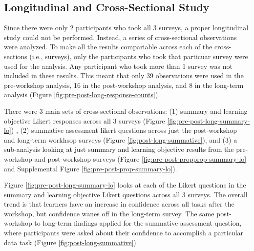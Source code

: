 \documentclass[030-workshop.tex]{subfiles}
\begin{document}
    \subsection{Longitudinal and Cross-Sectional Study}

        Since there were only 2 participants who took all 3 surveys,
        a proper longitudinal study could not be performed.
        Instead, a series of cross-sectional observations were analyzed.
        To make all the results compariable across each of the cross-sections (i.e., surveys),
        only the participants who took that particuar survey were used for the analysis.
        Any participant who took more than 1 survey was not included in these results.
        This meant that only
        39 observations were used in the pre-workshop analysis,
        16 in the post-workshop analysis, and
        8 in the long-term analysis
        (Figure \ref{fig:pre-post-long-response-counts}).

        There were 3 main sets of cross-sectional observations:
        (1) summary and learning objective Likert responses across all 3 surveys
        (Figure \ref{fig:pre-post-long-summary-lo})
        ,
        (2) summative assessment likert questions across just the post-workshop and long-term workhsop surveys
        (Figure \ref{fig:post-long-summative}), and
        (3) a sub-analysis looking at just summary and learning objective results from the pre-workshop and post-workshop surveys
        (Figure \ref{fig:pre-post-propprop-summary-lo} and Supplemental Figure \ref{fig:pre-post-prop-summary-lo}).

        Figure \ref{fig:pre-post-long-summary-lo} looks at each of the Likert questions in the
        summary and learning objective Likert questions across all 3 surveys.
        The overall trend is that learners have an increase in confidence across all tasks after the workshop,
        but confidence wanes off in the long-term survey.
        The same post-workshop to long-term findings applied for the summative assessment question,
        where participants were asked about their confidence to accomplish a particular data task
        (Figure \ref{fig:post-long-summative})
\end{document}
